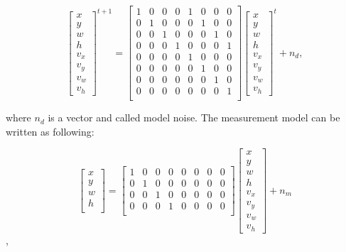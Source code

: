 \documentclass[conference]{IEEEtran}
\begin{document}
\[
\begin{bmatrix}
x \\
y \\
w \\
h \\
v_x \\
v_y \\
v_w \\
v_h
\end{bmatrix}^{t+1}
=
\begin{bmatrix}
1 &0 & 0 & 0  & 1 & 0 &0 &0 \\
0 &1 & 0 & 0  & 0 & 1 &0 &0 \\
0 &0 & 1 & 0  & 0 & 0 &1 &0 \\
0 &0 & 0 & 1  & 0 & 0 &0 &1 \\
0 &0 & 0 & 0  & 1 & 0 &0 &0 \\
0 &0 & 0 & 0  & 0 & 1 &0 &0 \\
0 &0 & 0 & 0  & 0 & 0 &1 &0 \\
0 &0 & 0 & 0  & 0 & 0 &0 &1 \\
\end{bmatrix}
\begin{bmatrix}
x \\
y \\
w \\
h \\
v_x \\
v_y \\
v_w \\
v_h
\end{bmatrix}^t+n_d,
\]

where $n_d$ is a vector and called model noise. The measurement model can be written as following:

\[
\begin{bmatrix}
x \\
y \\
w \\
h \\
\end{bmatrix}
=
\begin{bmatrix}
1 &0 & 0 & 0  & 0 & 0 &0 &0 \\
0 &1 & 0 & 0  & 0 & 0 &0 &0 \\
0 &0 & 1 & 0  & 0 & 0 &0 &0 \\
0 &0 & 0 & 1  & 0 & 0 &0 &0 \\

\end{bmatrix}
\begin{bmatrix}
x \\
y \\
w \\
h \\
v_x \\
v_y \\
v_w \\
v_h
\end{bmatrix}+n_m
\],
\end{document}
